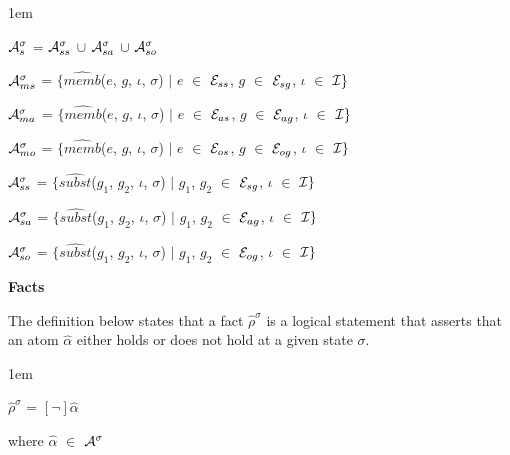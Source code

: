 \documentclass[11pt]{report}
\newenvironment{vquote}
{
  \begin{list}{}{\leftmargin 1em}\item[]
}
{
  \end{list}
}
\begin{document}
\begin{itemize}
\begin{vquote}
                ${\cal A}^{\sigma}_{s}$ =
                  ${\cal A}^{\sigma}_{ss}$ $\cup$
                  ${\cal A}^{\sigma}_{sa}$ $\cup$
                  ${\cal A}^{\sigma}_{so}$
    
                ${\cal A}^{\sigma}_{ms}$ =
                  $\{\hat{memb}$($e$, $g$, $\iota$, $\sigma$) $\mid$
                  $e$ $\in$ ${\cal E}_{ss}$,
                  $g$ $\in$ ${\cal E}_{sg}$,
                  $\iota$ $\in$ ${\cal I}\}$
    
                ${\cal A}^{\sigma}_{ma}$ =
                  $\{\hat{memb}$($e$, $g$, $\iota$, $\sigma$) $\mid$
                  $e$ $\in$ ${\cal E}_{as}$,
                  $g$ $\in$ ${\cal E}_{ag}$,
                  $\iota$ $\in$ ${\cal I}\}$
    
                ${\cal A}^{\sigma}_{mo}$ =
                  $\{\hat{memb}$($e$, $g$, $\iota$, $\sigma$) $\mid$
                  $e$ $\in$ ${\cal E}_{os}$,
                  $g$ $\in$ ${\cal E}_{og}$,
                  $\iota$ $\in$ ${\cal I}\}$
    
                ${\cal A}^{\sigma}_{ss}$ =
                  $\{\hat{subst}$($g_{1}$, $g_{2}$, $\iota$, $\sigma$) $\mid$
                  $g_{1}$, $g_{2}$ $\in$ ${\cal E}_{sg}$,
                  $\iota$ $\in$ ${\cal I}\}$
    
                ${\cal A}^{\sigma}_{sa}$ =
                  $\{\hat{subst}$($g_{1}$, $g_{2}$, $\iota$, $\sigma$) $\mid$
                  $g_{1}$, $g_{2}$ $\in$ ${\cal E}_{ag}$,
                  $\iota$ $\in$ ${\cal I}\}$
    
                ${\cal A}^{\sigma}_{so}$ =
                  $\{\hat{subst}$($g_{1}$, $g_{2}$, $\iota$, $\sigma$) $\mid$
                  $g_{1}$, $g_{2}$ $\in$ ${\cal E}_{og}$,
                  $\iota$ $\in$ ${\cal I}\}$
              \end{vquote}
          
            \item
              {\bf Facts}

              The definition below states that a fact $\hat{\rho}^\sigma$ is a
              logical statement that asserts that an atom $\hat{\alpha}$ either
              holds or does not hold at a given state $\sigma$.

              \begin{vquote}
                $\hat{\rho}^{\sigma}$ =
                  $[\lnot]$$\hat{\alpha}$

                where
                $\hat{\alpha}$ $\in$ ${\cal A}^{\sigma}$
              \end{vquote}


\end{itemize}
\end{document}

